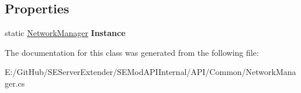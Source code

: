 \subsection*{Properties}
\begin{DoxyCompactItemize}
\item 
\hypertarget{class_s_e_mod_a_p_i_internal_1_1_a_p_i_1_1_common_1_1_network_manager_aaa57dafe58a43ebecebcee8742f4b5c6}{}static \hyperlink{class_s_e_mod_a_p_i_internal_1_1_a_p_i_1_1_common_1_1_network_manager}{Network\+Manager} {\bfseries Instance}\label{class_s_e_mod_a_p_i_internal_1_1_a_p_i_1_1_common_1_1_network_manager_aaa57dafe58a43ebecebcee8742f4b5c6}

\end{DoxyCompactItemize}


The documentation for this class was generated from the following file\+:\begin{DoxyCompactItemize}
\item 
E\+:/\+Git\+Hub/\+S\+E\+Server\+Extender/\+S\+E\+Mod\+A\+P\+I\+Internal/\+A\+P\+I/\+Common/Network\+Manager.\+cs\end{DoxyCompactItemize}
